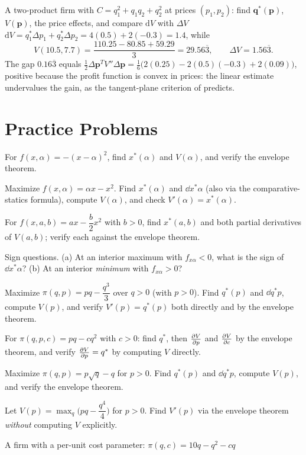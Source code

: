 \begin{worked}{A two-product firm with $C=q_1^{2}+q_1q_2+q_2^{2}$ at prices $(p_1,p_2)$: find $\mathbf{q}^*(\mathbf{p})$, $V(\mathbf{p})$, the price effects, and compare $\mathrm{d}V$ with $\Delta V$}
$\mathrm{d}V=q_1^*\Delta p_1+q_2^*\Delta p_2=4(0.5)+2(-0.3)=1.4$, while
\[
  V(10.5,7.7)=\frac{110.25-80.85+59.29}{3}=29.56\overline3,
  \qquad \Delta V=1.56\overline3 .
\]
The gap $0.16\overline3$ equals
$\tfrac12\Delta\mathbf{p}^{T}V''\Delta\mathbf{p}
=\tfrac16\bigl(2(0.25)-2(0.5)(-0.3)+2(0.09)\bigr)$, positive because the
profit function is convex in prices: the linear estimate undervalues the
gain, as the tangent-plane criterion of  predicts.
\end{worked}

\section{Practice Problems}

\begin{problems}
  \item For $f(x,\alpha)=-(x-\alpha)^2$, find $x^*(\alpha)$ and
        $V(\alpha)$, and verify the envelope theorem.
  \item Maximize $f(x,\alpha)=\alpha x-x^2$. Find $x^*(\alpha)$ and
        $\dd{x^*}{\alpha}$ (also via the comparative-statics formula),
        compute $V(\alpha)$, and check $V'(\alpha)=x^*(\alpha)$.
  \item For $f(x,a,b)=ax-\dfrac{b}{2}x^2$ with $b>0$, find $x^*(a,b)$
        and both partial derivatives of $V(a,b)$; verify each against the
        envelope theorem.
  \item Sign questions. (a) At an interior maximum with
        $f_{x\alpha}<0$, what is the sign of $\dd{x^*}{\alpha}$?
        (b) At an interior \emph{minimum} with $f_{x\alpha}>0$?
  \item Maximize $\pi(q,p)=pq-\dfrac{q^3}{3}$ over $q>0$ (with $p>0$).
        Find $q^*(p)$ and $\dd{q^*}{p}$, compute $V(p)$, and verify
        $V'(p)=q^*(p)$ both directly and by the envelope theorem.
  \item For $\pi(q,p,c)=pq-cq^2$ with $c>0$: find $q^*$, then
        $\frac{\partial V}{\partial p}$ and $\frac{\partial V}{\partial c}$ by the envelope theorem, and verify
        $\frac{\partial V}{\partial p}=q^*$ by computing $V$ directly.
  \item Maximize $\pi(q,p)=p\sqrt{q}-q$ for $p>0$. Find $q^*(p)$ and
        $\dd{q^*}{p}$, compute $V(p)$, and verify the envelope theorem.
  \item Let $V(p)=\max_q\bigl(pq-\dfrac{q^4}{4}\bigr)$ for $p>0$. Find
        $V'(p)$ via the envelope theorem \emph{without} computing $V$
        explicitly.
  \item A firm with a per-unit cost parameter: $\pi(q,c)=10q-q^2-cq$

\end{problems}
